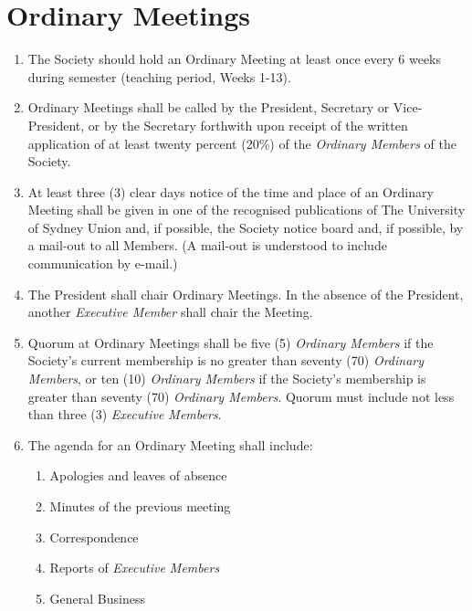 \documentclass[11pt]{article}
\begin{document}
\section{Ordinary Meetings}
\begin{enumerate}[\thesection .1]
    \item The Society should hold an Ordinary Meeting at least once every 6 weeks during semester (teaching period, Weeks 1-13).
    \item Ordinary Meetings shall be called by the President, Secretary or Vice-President, or by the Secretary forthwith upon receipt of the written application of at least twenty percent (20\%) of the \textit{Ordinary Members} of the Society.
    \item At least three (3) clear days notice of the time and place of an Ordinary Meeting shall be given in one of the recognised publications of The University of Sydney Union and, if possible, the Society notice board and, if possible, by a mail-out to all Members. (A mail-out is understood to include communication by e-mail.)
    \item The President shall chair Ordinary Meetings. In the absence of the President, another \textit{Executive Member} shall chair the Meeting.
    \item Quorum at Ordinary Meetings shall be five (5) \textit{Ordinary Members} if the Society’s current membership is no greater than seventy (70) \textit{Ordinary Members}, or ten (10) \textit{Ordinary Members} if the Society’s membership is greater than seventy (70) \textit{Ordinary Members}. Quorum must include not less than three (3) \textit{Executive Members}.
    \item The agenda for an Ordinary Meeting shall include:
    \begin{enumerate}[\hspace{5mm}1.]
        \item Apologies and leaves of absence
        \item Minutes of the previous meeting
        \item Correspondence
        \item Reports of \textit{Executive Members}
        \item General Business
    \end{enumerate}
    

\end{enumerate}
\end{document}
